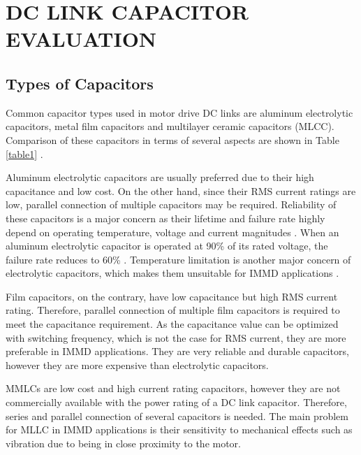 \documentclass[conference,a4paper,twocolumn]{IEEEtran}
\begin{document}
\section{DC LINK CAPACITOR EVALUATION}

\subsection{Types of Capacitors}


Common capacitor types used in motor drive DC links are aluminum electrolytic capacitors, metal film capacitors and multilayer ceramic capacitors (MLCC). Comparison of these capacitors in terms of several aspects are shown in Table \ref{table1} \cite{LoCalzo2016,Lambert2015a,Wang2013,Wang2015,Brown2007}.

Aluminum electrolytic capacitors are usually preferred due to their high capacitance and low cost. On the other hand, since their RMS current ratings are low, parallel connection of multiple capacitors may be required. Reliability of these capacitors is a major concern as their lifetime and failure rate highly depend on operating temperature, voltage and current magnitudes \cite{Su2010}. When an aluminum electrolytic capacitor is operated at 90\% of its rated voltage, the failure rate reduces to 60\% \cite{Bianchi2003}. Temperature limitation is another major concern of electrolytic capacitors, which makes them unsuitable for IMMD applications \cite{Brown2007}.

Film capacitors, on the contrary, have low capacitance but high RMS current rating. Therefore, parallel connection of multiple film capacitors is required to meet the capacitance requirement. As the capacitance value can be optimized with switching frequency, which is not the case for RMS current, they are more preferable in IMMD applications. They are very reliable and durable capacitors, however they are more expensive than electrolytic capacitors.

MMLCs are low cost and high current rating capacitors, however they are not commercially available with the power rating of a DC link capacitor. Therefore, series and parallel connection of several capacitors is needed. The main problem for MLLC in IMMD applications is their sensitivity to mechanical effects such as vibration \cite{Brown2007} due to being in close proximity to the motor.
\end{document}
